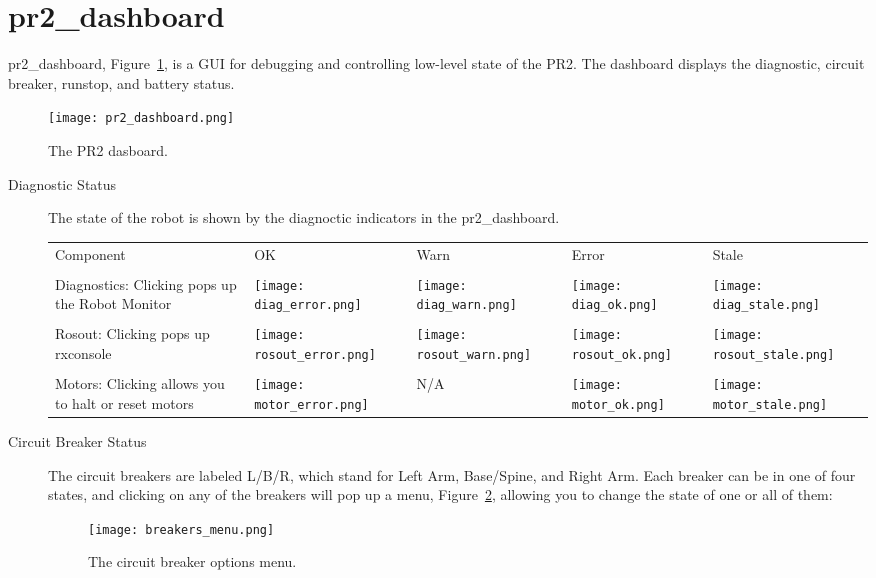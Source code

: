 \section{pr2\_dashboard}
pr2\_dashboard, Figure~\ref{fig:dashboard}, is a GUI for debugging and controlling low-level state of the PR2. The dashboard displays the diagnostic, 
circuit breaker, runstop, and battery status.
\begin{figure}[h]
\centering
\texttt{[image: pr2\_dashboard.png]}
\caption{The PR2 dasboard.}
\label{fig:dashboard}
\end{figure}
\begin{description}
\item[Diagnostic Status] The state of the robot is shown by the diagnoctic indicators in the pr2\_dashboard. \\

    \begin{tabular}{m{6cm}SSSS}
    Component & OK & Warn & Error & Stale\\
    &&&&\\
    Diagnostics: Clicking pops up the Robot Monitor & \texttt{[image: diag\_error.png]}&\texttt{[image: diag\_warn.png]}&
                                                      \texttt{[image: diag\_ok.png]}&\texttt{[image: diag\_stale.png]}\\
    &&&&\\
    Rosout: Clicking pops up rxconsole & \texttt{[image: rosout\_error.png]}&\texttt{[image: rosout\_warn.png]}&
                                        \texttt{[image: rosout\_ok.png]}&\texttt{[image: rosout\_stale.png]}\\
    &&&&\\
    Motors: Clicking allows you to halt or reset motors & \texttt{[image: motor\_error.png]}& N/A &
                                                          \texttt{[image: motor\_ok.png]}&\texttt{[image: motor\_stale.png]}\\
   \end{tabular}

\item[Circuit Breaker Status] The circuit breakers are labeled L/B/R, which stand for Left Arm, Base/Spine, and Right Arm. 
Each breaker can be in one of four states, and clicking on any of the breakers will pop up a menu, Figure~\ref{fig:breaker_menu}, allowing you to change 
the state of one or all of them:
\begin{figure}[h]
\centering
\texttt{[image: breakers\_menu.png]}
\caption{The circuit breaker options menu.}
\label{fig:breaker_menu}
\end{figure}


\end{description}
